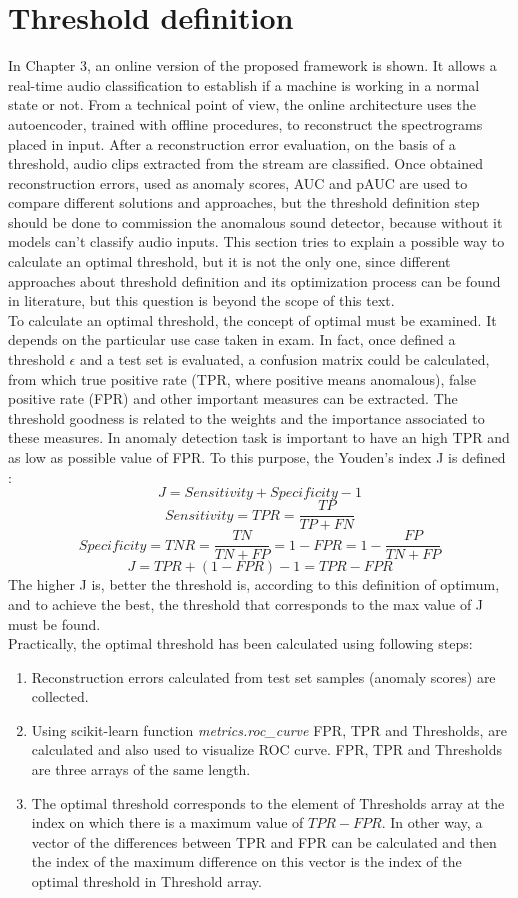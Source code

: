 \section{Threshold definition}
In Chapter 3, an online version of the proposed framework is shown. It allows a real-time audio classification to establish if a machine is working in a normal state or not. From a technical point of view, the online architecture uses the autoencoder, trained with offline procedures, to reconstruct the spectrograms placed in input. After a reconstruction error evaluation, on the basis of a threshold, audio clips extracted from the stream are classified. Once obtained reconstruction errors, used as anomaly scores, AUC and pAUC are used to compare different solutions and approaches, but the threshold definition step should be done to commission the anomalous sound detector, because without it models can't classify audio inputs. This section tries to explain a possible way to calculate an optimal threshold, but it is not the only one, since different approaches about threshold definition and its optimization process can be found in literature, but this question is beyond the scope of this text. \\
To calculate an optimal threshold, the concept of optimal must be examined. It depends on the particular use case taken in exam. In fact, once defined a threshold $\epsilon$ and a test set is evaluated, a confusion matrix could be calculated, from which true positive rate (TPR, where positive means anomalous), false positive rate (FPR) and other important measures can be extracted. The threshold goodness is related to the weights and the importance associated to these measures. In anomaly detection task is important to have an high TPR and as low as possible value of FPR. To this purpose, the Youden's index J is defined \cite{13RealTimeDetectionUsingSequentialAutoencoder}:
\[ J = Sensitivity + Specificity - 1\]\[ Sensitivity = TPR = \frac{TP}{TP+FN}\]\[ Specificity = TNR = \frac{TN}{TN+FP} = 1-FPR = 1-\frac{FP}{TN+FP}\]\[ J = TPR+(1-FPR)-1 = TPR-FPR \]
The higher J is, better the threshold is, according to this definition of optimum, and to achieve the best, the threshold that corresponds to the max value of J must be found.\\
Practically, the optimal threshold has been calculated using following steps:
\begin{enumerate}
    \item {Reconstruction errors calculated from test set samples (anomaly scores) are collected.}
    \item {Using scikit-learn function \textit{metrics.roc\_curve} FPR, TPR and Thresholds, are calculated and also used to visualize ROC curve. FPR, TPR and Thresholds are three arrays of the same length.}
    \item {The optimal threshold corresponds to the element of Thresholds array at the index on which there is a maximum value of $TPR-FPR$. In other way, a vector of the differences between TPR and FPR can be calculated and then the index of the maximum difference on this vector is the index of the optimal threshold in Threshold array.}
\end{enumerate}
